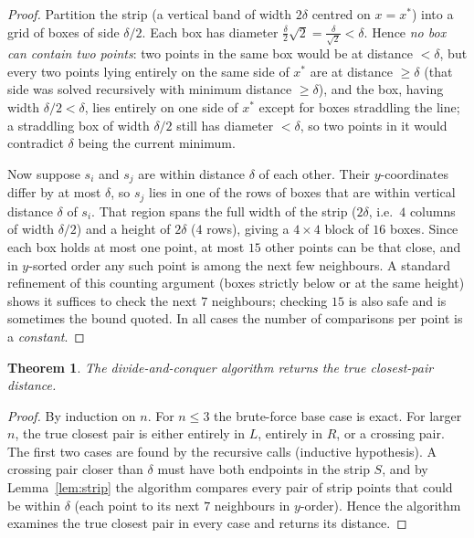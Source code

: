 \documentclass[11pt]{article}
\newtheorem{theorem}{Theorem}[section]
\begin{document}
\begin{proof}
Partition the strip (a vertical band of width $2\delta$ centred on $x = x^*$) into a grid of
boxes of side $\delta/2$. Each box has diameter $\frac{\delta}{2}\sqrt{2} = \frac{\delta}{\sqrt 2}
< \delta$. Hence \emph{no box can contain two points}: two points in the same box would be
at distance $< \delta$, but every two points lying entirely on the same side of $x^*$ are at
distance $\ge \delta$ (that side was solved recursively with minimum distance $\ge \delta$),
and the box, having width $\delta/2 < \delta$, lies entirely on one side of $x^*$ except for
boxes straddling the line; a straddling box of width $\delta/2$ still has diameter $<\delta$,
so two points in it would contradict $\delta$ being the current minimum.

Now suppose $s_i$ and $s_j$ are within distance $\delta$ of each other. Their $y$-coordinates
differ by at most $\delta$, so $s_j$ lies in one of the rows of boxes that are within
vertical distance $\delta$ of $s_i$. That region spans the full width of the strip ($2\delta$,
i.e.\ $4$ columns of width $\delta/2$) and a height of $2\delta$ ($4$ rows), giving a
$4 \times 4$ block of $16$ boxes. Since each box holds at most one point, at most $15$ other
points can be that close, and in $y$-sorted order any such point is among the next few
neighbours. A standard refinement of this counting argument (boxes strictly below or at the
same height) shows it suffices to check the next $7$ neighbours; checking $15$ is also safe
and is sometimes the bound quoted. In all cases the number of comparisons per point is a
\emph{constant}.
\end{proof}

\begin{theorem}
The divide-and-conquer algorithm returns the true closest-pair distance.
\end{theorem}

\begin{proof}
By induction on $n$. For $n \le 3$ the brute-force base case is exact. For larger $n$, the
true closest pair is either entirely in $L$, entirely in $R$, or a crossing pair. The first
two cases are found by the recursive calls (inductive hypothesis). A crossing pair closer
than $\delta$ must have both endpoints in the strip $S$, and by Lemma~\ref{lem:strip} the
algorithm compares every pair of strip points that could be within $\delta$ (each point to
its next $7$ neighbours in $y$-order). Hence the algorithm examines the true closest pair in
every case and returns its distance.
\end{proof}
\end{document}
